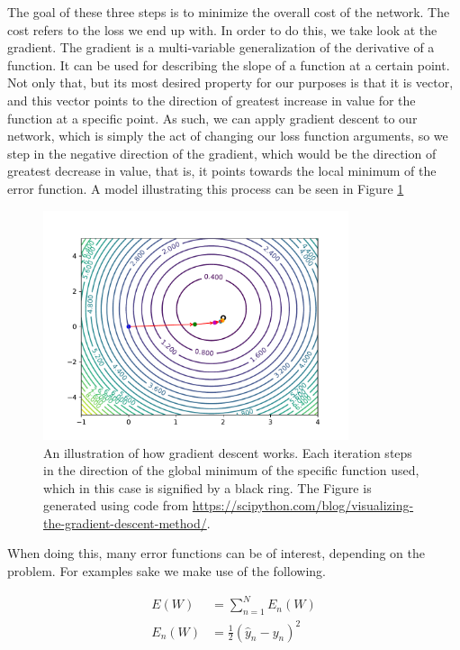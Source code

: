 The goal of these three steps is to minimize the overall cost of the network.
The cost refers to the loss we end up with. In order to do this, we take look at
the gradient. The gradient is a multi-variable generalization of the derivative
of a function. It can be used for describing the slope of a function at a
certain point. Not only that, but its most desired property for our purposes is
that it is vector, and this vector points to the direction of greatest increase
in value for the function at a specific point. As such, we can apply gradient
descent to our network, which is simply the act of changing our loss function
arguments, so we step in the negative direction of the gradient, which would
be the direction of greatest decrease in value, that is, it points towards the
local minimum of the error function. A model illustrating this process can be
seen in Figure \ref{fig:grad}

\begin{figure}
    \centering
    \includegraphics[width=0.8\textwidth]{./pictures/method/gradient_descend}
    \caption{An illustration of how gradient descent works. Each iteration steps
        in the direction of the global minimum of the specific function used,
        which in this case is signified by a black ring. The Figure is generated
        using code from
        \url{https://scipython.com/blog/visualizing-the-gradient-descent-method/}.}
    \label{fig:grad}
\end{figure}

When doing this, many error functions can be of interest, depending on the
problem. For examples sake we make use of the following.

\begin{align}
E(W) &= \sum_{n=1}^N E_n(W)\\
E_n(W) &= \frac{1}{2}(\hat{y}_n - y_n)^2
\end{align}

